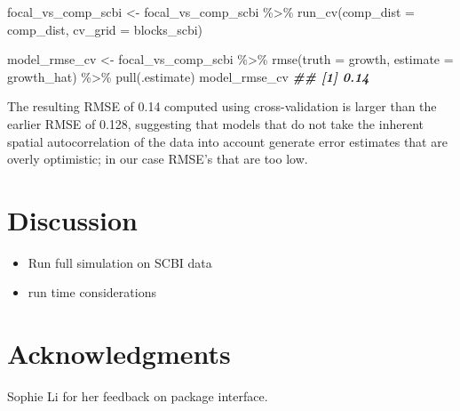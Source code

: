 \documentclass[12pt]{article}
\providecommand{\tightlist}{%
  \setlength{\itemsep}{0pt}\setlength{\parskip}{0pt}}
\newenvironment{Shaded}{\begin{snugshade}}{\end{snugshade}}
\newcommand{\AttributeTok}[1]{\textcolor[rgb]{0.77,0.63,0.00}{#1}}
\newcommand{\DocumentationTok}[1]{\textcolor[rgb]{0.56,0.35,0.01}{\textbf{\textit{#1}}}}
\newcommand{\FunctionTok}[1]{\textcolor[rgb]{0.00,0.00,0.00}{#1}}
\newcommand{\NormalTok}[1]{#1}
\newcommand{\OtherTok}[1]{\textcolor[rgb]{0.56,0.35,0.01}{#1}}
\newcommand{\SpecialCharTok}[1]{\textcolor[rgb]{0.00,0.00,0.00}{#1}}
\begin{document}
\begin{Shaded}
\begin{Highlighting}[]
\NormalTok{focal\_vs\_comp\_scbi }\OtherTok{\textless{}{-}}\NormalTok{ focal\_vs\_comp\_scbi }\SpecialCharTok{\%\textgreater{}\%}
  \FunctionTok{run\_cv}\NormalTok{(}\AttributeTok{comp\_dist =}\NormalTok{ comp\_dist, }\AttributeTok{cv\_grid =}\NormalTok{ blocks\_scbi)}
\end{Highlighting}
\end{Shaded}

\begin{Shaded}
\begin{Highlighting}[]
\NormalTok{model\_rmse\_cv }\OtherTok{\textless{}{-}}\NormalTok{ focal\_vs\_comp\_scbi }\SpecialCharTok{\%\textgreater{}\%}
  \FunctionTok{rmse}\NormalTok{(}\AttributeTok{truth =}\NormalTok{ growth, }\AttributeTok{estimate =}\NormalTok{ growth\_hat) }\SpecialCharTok{\%\textgreater{}\%}
  \FunctionTok{pull}\NormalTok{(.estimate)}
\NormalTok{model\_rmse\_cv}
\DocumentationTok{\#\# [1] 0.14}
\end{Highlighting}
\end{Shaded}

The resulting RMSE of 0.14 computed using cross-validation is larger
than the earlier RMSE of 0.128, suggesting that models that do not take
the inherent spatial autocorrelation of the data into account generate
error estimates that are overly optimistic; in our case RMSE's that are
too low.

\hypertarget{discussion}{%
\section{Discussion}\label{discussion}}

\begin{itemize}
\tightlist
\item
  Run full simulation on SCBI data
\item
  run time considerations
\end{itemize}

\hypertarget{acknowledgments}{%
\section{Acknowledgments}\label{acknowledgments}}

Sophie Li for her feedback on package interface.



\end{document}
